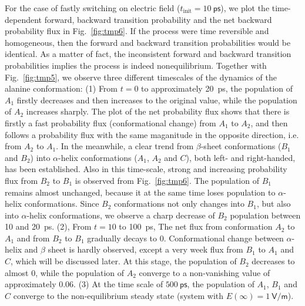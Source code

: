 \documentclass[aip,jcp,a4paper,preprint,onecolumn]{revtex4-1}
\begin{document}
For the case of fastly switching on electric field
($t_{\textrm{init}}=10~\textsf{ps}$),
we plot the time-dependent forward, backward transition probability and the net backward probability flux
in Fig.~\ref{fig:tmp6}.
If the process were time reversible and homogeneous, then the forward and backward transition probabilities
would be identical. As a matter of fact, the inconsistent forward and backward transition probabilities
implies the process is indeed nonequilibrium.
Together with Fig.~\ref{fig:tmp5}, we observe
three different timescales of 
the dynamics of the alanine conformation:
(1) From
$t=0$ to approximately 20~\textsf{ps}, the population of $A_1$ firstly decreases and then increases to the original value,
while the population of $A_2$ increases sharply. The plot of the net probability flux shows that 
there is firstly a fast probability flux (conformational change) from
$A_1$ to $A_2$, and then follows a probability flux with the same maganitude in the opposite direction, i.e.  from
$A_2$ to $A_1$.
In the meanwhile, a clear trend from $\beta$-sheet conformations ($B_1$ and $B_2$)
into $\alpha$-helix conformations ($A_1$, $A_2$ and $C$), both left- and right-handed,
has been established.
Also in this time-scale, strong and increasing probability flux from $B_2$ to $B_1$ is observed from Fig.~\ref{fig:tmp6}.
The population of $B_1$ remains almost unchanged,
because it  at the same time loses population to $\alpha$-helix conformations.
Since  $B_2$ conformations not only changes into $B_1$, but also into $\alpha$-helix conformations, we observe a charp
decrease of $B_2$ population between 10 and 20~ps.
(2), From $t=10$ to
100~\textsf{ps},
The net flux from  conformation $A_2$ to $A_1$ and from $B_2$ to $B_1$
gradually decays to 0. Conformational change between $\alpha$-helix and $\beta$ sheet
is hardly observed, except a very week flux from $B_1$ to $A_1$ and $C$, which will be discussed later.
At this stage, the population of $B_2$ decreases to almost 0, while the population of $A_2$
converge to a non-vanishing value of approximately 0.06.
(3) At the time scale of $
500~\textsf{ps}$, the population of $A_1$, $B_1$ and $C$ converge to
the non-equilibrium steady state (system with $E(\infty) = 1~\textsf{V/m}$).
\end{document}
